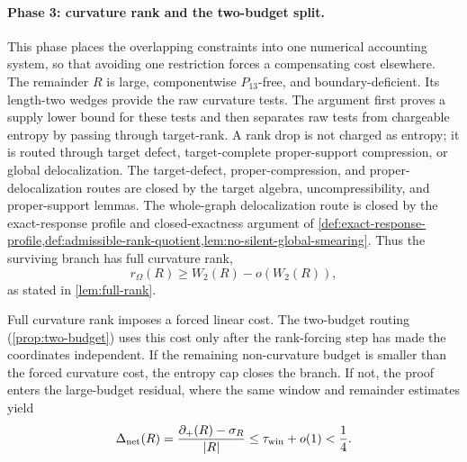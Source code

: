 \documentclass[11pt]{article}
\newcommand{\defp}{\partial_+}
\begin{document}
\paragraph{Phase 3: curvature rank and the two-budget split.}
This phase places the overlapping constraints into one numerical accounting
system, so that avoiding one restriction forces a compensating cost elsewhere.
The remainder $R$ is large, componentwise $P_{13}$-free, and boundary-deficient.
Its length-two wedges provide the raw curvature tests.  The argument first
proves a supply lower bound for these tests and then separates raw tests from
chargeable entropy by passing through target-rank.  A rank drop is not charged
as entropy; it is routed through target defect, target-complete proper-support
compression, or global delocalization.  The target-defect, proper-compression,
and proper-delocalization routes are closed by the target algebra,
uncompressibility, and proper-support lemmas.  The whole-graph delocalization
route is closed by the exact-response profile and closed-exactness argument of
\cref{def:exact-response-profile,def:admissible-rank-quotient,lem:no-silent-global-smearing}.
Thus the surviving branch has full curvature rank,
\[
r_\Omega(R)\ge W_2(R)-o(W_2(R)),
\]
as stated in \cref{lem:full-rank}.

Full curvature rank imposes a forced linear cost.  The two-budget routing
(\cref{prop:two-budget}) uses this cost only after the rank-forcing step has
made the coordinates independent.  If the remaining non-curvature budget is
smaller than the forced curvature cost, the entropy cap closes the branch.  If
not, the proof enters the large-budget residual, where the same window and
remainder estimates yield
\[
\Delta_{\mathrm{net}}(R)
=\frac{\defp(R)-\sigma_R}{|R|}
\le \tau_{\rm win}+o(1)<\frac14 .
\]
\end{document}
